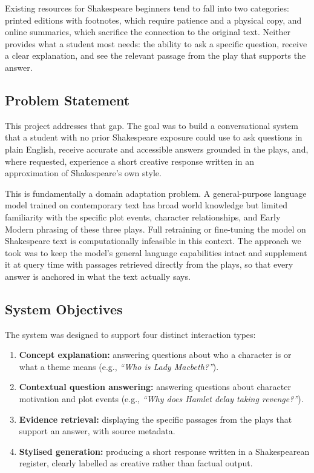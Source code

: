 \documentclass[10pt,conference]{IEEEtran}
\begin{document}
Existing resources for Shakespeare beginners tend to fall into two
categories: printed editions with footnotes, which require patience
and a physical copy, and online summaries, which sacrifice the
connection to the original text. Neither provides what a student most
needs: the ability to ask a specific question, receive a clear
explanation, and see the relevant passage from the play that supports
the answer.

\subsection{Problem Statement}

This project addresses that gap. The goal was to build a
conversational system that a student with no prior Shakespeare exposure
could use to ask questions in plain English, receive accurate and
accessible answers grounded in the plays, and, where requested,
experience a short creative response written in an approximation of
Shakespeare's own style.

This is fundamentally a domain adaptation problem. A general-purpose
language model trained on contemporary text has broad world knowledge
but limited familiarity with the specific plot events, character
relationships, and Early Modern phrasing of these three plays. Full
retraining or fine-tuning the model on Shakespeare text is
computationally infeasible in this context. The approach we took was
to keep the model's general language capabilities intact and
supplement it at query time with passages retrieved directly from the
plays, so that every answer is anchored in what the text actually
says.

\subsection{System Objectives}

The system was designed to support four distinct interaction types:

\begin{enumerate}
  \item \textbf{Concept explanation:} answering questions about who
        a character is or what a theme means (e.g., \textit{``Who is
        Lady Macbeth?''}).
  \item \textbf{Contextual question answering:} answering questions
        about character motivation and plot events (e.g., \textit{``Why
        does Hamlet delay taking revenge?''}).
  \item \textbf{Evidence retrieval:} displaying the specific passages
        from the plays that support an answer, with source metadata.
  \item \textbf{Stylised generation:} producing a short response
        written in a Shakespearean register, clearly labelled as
        creative rather than factual output.
\end{enumerate}
\end{document}
